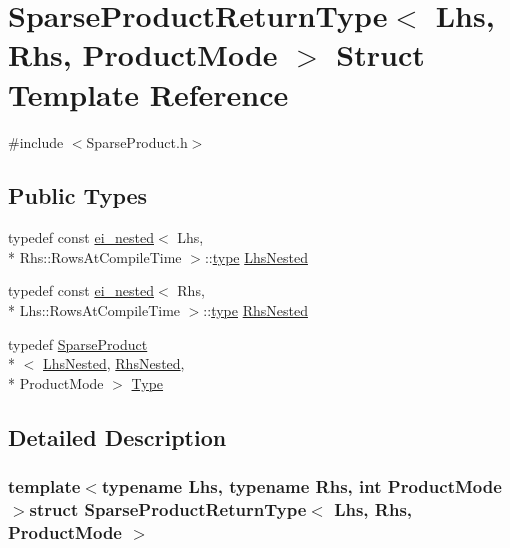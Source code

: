 \hypertarget{struct_sparse_product_return_type}{\section{Sparse\-Product\-Return\-Type$<$ Lhs, Rhs, Product\-Mode $>$ Struct Template Reference}
\label{struct_sparse_product_return_type}
}


{\ttfamily \#include $<$Sparse\-Product.\-h$>$}

\subsection*{Public Types}
\begin{DoxyCompactItemize}
\item 
typedef const \hyperlink{structei__nested}{ei\-\_\-nested}$<$ Lhs, \\*
Rhs\-::\-Rows\-At\-Compile\-Time $>$\-::\hyperlink{glext_8h_a7d05960f4f1c1b11f3177dc963a45d86}{type} \hyperlink{struct_sparse_product_return_type_ab79998bc0fe82c34b85f49ec6524b120}{Lhs\-Nested}
\item 
typedef const \hyperlink{structei__nested}{ei\-\_\-nested}$<$ Rhs, \\*
Lhs\-::\-Rows\-At\-Compile\-Time $>$\-::\hyperlink{glext_8h_a7d05960f4f1c1b11f3177dc963a45d86}{type} \hyperlink{struct_sparse_product_return_type_aae08a821c3da300bea20971f5d2165e0}{Rhs\-Nested}
\item 
typedef \hyperlink{class_sparse_product}{Sparse\-Product}\\*
$<$ \hyperlink{struct_sparse_product_return_type_ab79998bc0fe82c34b85f49ec6524b120}{Lhs\-Nested}, \hyperlink{struct_sparse_product_return_type_aae08a821c3da300bea20971f5d2165e0}{Rhs\-Nested}, \\*
Product\-Mode $>$ \hyperlink{struct_sparse_product_return_type_a832768e07833711d1e9bf6f6e3d3b346}{Type}
\end{DoxyCompactItemize}


\subsection{Detailed Description}
\subsubsection*{template$<$typename Lhs, typename Rhs, int Product\-Mode$>$struct Sparse\-Product\-Return\-Type$<$ Lhs, Rhs, Product\-Mode $>$}



